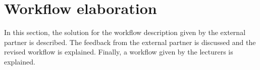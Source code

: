 \section{Workflow elaboration}
In this section, the solution for the workflow description given by the external partner is described. The feedback from the external partner is discussed and the revised workflow is explained. Finally, a workflow given by the lecturers is explained.






